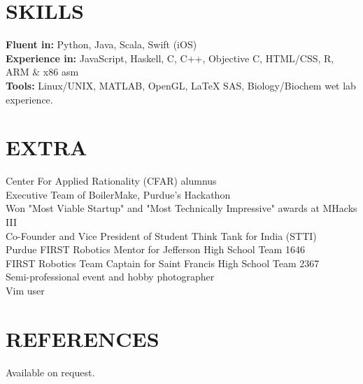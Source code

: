 \documentclass[margin,5pt]{res} %
\begin{document}
\begin{resume}
\section{SKILLS} 
	{\bf Fluent in:} Python, Java, Scala, Swift (iOS)\\
 	{\bf Experience in:} JavaScript, Haskell, C, C++, Objective C, HTML/CSS, R, ARM \& x86 asm\\
	{\bf Tools:} Linux/UNIX, MATLAB, OpenGL, LaTeX SAS, Biology/Biochem wet lab experience.


\section{EXTRA}  
	Center For Applied Rationality (CFAR) alumnus\\     
	Executive Team of BoilerMake, Purdue's Hackathon\\
	Won "Most Viable Startup" and "Most Technically Impressive" awards at MHacks III\\
	Co-Founder and Vice President of Student Think Tank for India (STTI) \\
	Purdue FIRST Robotics Mentor for Jefferson High School Team 1646\\
	FIRST Robotics Team Captain for Saint Francis High School Team 2367\\
	Semi-professional event and hobby photographer\\
	Vim user

\section{REFERENCES}
	Available on request.

\end{resume}
\end{document}
